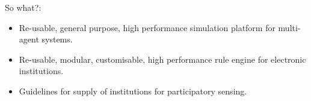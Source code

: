 So what?:
\begin{itemize}
\item Re-usable, general purpose, high performance simulation platform for multi-agent systems.
\item Re-usable, modular, customisable, high performance rule engine for electronic institutions.
\item Guidelines for supply of institutions for participatory sensing.
\end{itemize}

\endgroup			

\vfill